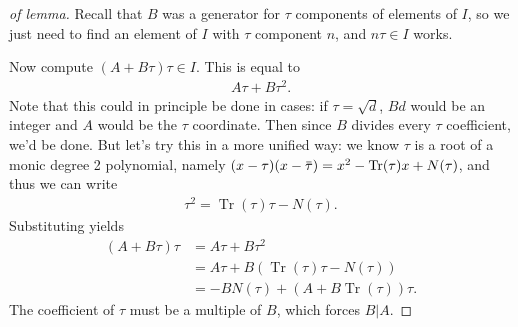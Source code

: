 \begin{proof}[of lemma]

Recall that \(B\) was a generator for \(\tau\) components of elements of
\(I\), so we just need to find an element of \(I\) with \(\tau\)
component \(n\), and \(n \tau \in I\) works.

Now compute \((A + B \tau) \tau\in I\). This is equal to
\begin{align*}
A \tau + B \tau^2
.\end{align*}
Note that this could in principle be done in cases: if
\(\tau = \sqrt{d}\), \(Bd\) would be an integer and \(A\) would be the
\(\tau\) coordinate. Then since \(B\) divides every \(\tau\)
coefficient, we'd be done. But let's try this in a more unified way: we
know \(\tau\) is a root of a monic degree 2 polynomial, namely
\((x - \tau) (x - \mkern 1.5mu\overline{\mkern-1.5mu\tau\mkern-1.5mu}\mkern 1.5mu) = x^2 - \operatorname{Tr}( \tau)x + N( \tau)\),
and thus we can write
\begin{align*}
\tau^2 = \operatorname{Tr}( \tau) \tau - N( \tau)
.\end{align*}
Substituting yields
\begin{align*}
(A + B \tau) \tau
&= A \tau + B \tau^2 \\
&= A \tau + B ( \operatorname{Tr}( \tau) \tau - N( \tau) ) \\
&= - B N( \tau) + (A + B \operatorname{Tr}( \tau ) ) \tau
.\end{align*}
The coefficient of \(\tau\) must be a multiple of \(B\), which forces
\(B\mathrel{\Big|}A\).

\end{proof}

